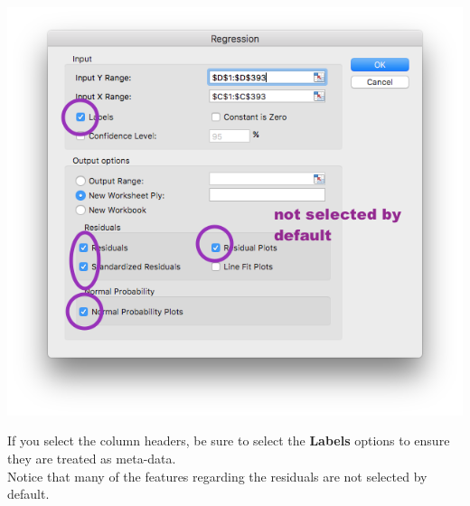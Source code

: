 \documentclass[xcolor=svgnames]{beamer}
\begin{document}
\begin{frame}
\begin{center}
\includegraphics[height=.6\textheight]{regpopup}
\end{center}
If you select the column headers, be sure to select the {\bf Labels} options to ensure they are treated as meta-data.\\
\medskip
Notice that many of the features regarding the residuals are not selected by default.
\end{frame}



\end{document}
